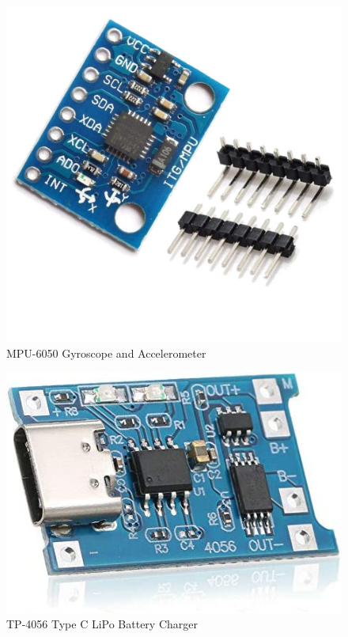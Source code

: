 \begin{center}
    \begin{figure}
        \centering
        \includegraphics[scale=0.2]{diagrams/oem/6050.jpg}
        \caption{MPU-6050 Gyroscope and Accelerometer}
        \label{fig:6050}
    \end{figure}
\end{center}

\begin{center}
    \begin{figure}
        \centering
        \includegraphics[scale=0.3]{diagrams/oem/4056.jpg}
        \caption{TP-4056 Type C LiPo Battery Charger}
        \label{fig4055}
    \end{figure}
\end{center}




